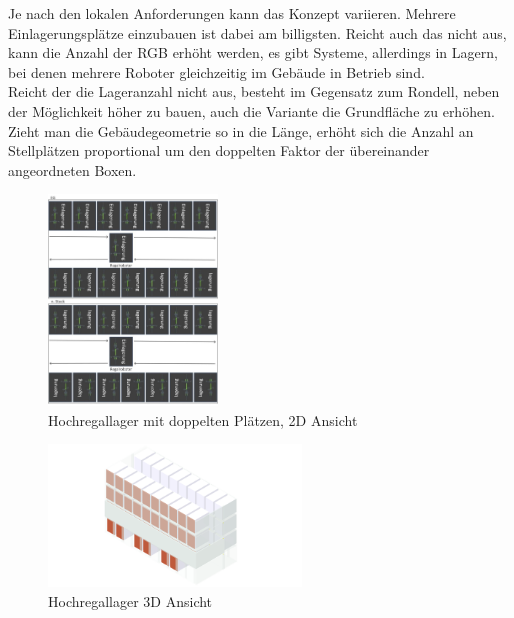 \clearpage

Je nach den lokalen Anforderungen kann das Konzept variieren. Mehrere Einlagerungsplätze einzubauen ist dabei am billigsten. Reicht auch das nicht aus, kann die Anzahl der RGB erhöht werden, es gibt Systeme, allerdings in Lagern, bei denen mehrere Roboter gleichzeitig im Gebäude in Betrieb sind. \\
Reicht der die Lageranzahl nicht aus, besteht im Gegensatz zum Rondell, neben der Möglichkeit höher zu bauen, auch die Variante die Grundfläche zu erhöhen. Zieht man die Gebäudegeometrie so in die Länge, erhöht sich die Anzahl an Stellplätzen proportional um den doppelten Faktor der übereinander angeordneten Boxen. \\
\begin{figure}[H]
    \centering
    \includegraphics[width=0.4\textwidth]{images/hochregallager2ddoppelt.jpg}
    \caption{Hochregallager mit doppelten Plätzen, 2D Ansicht}
    \label{fig:hochregallager2ddoppelt}
\end{figure}
\begin{figure}[H]
    \centering
    \includegraphics[width=0.6\textwidth]{images/hochregallager3d.png}
    \caption{Hochregallager 3D Ansicht}
    \label{fig:hochregallager3d}
\end{figure}

